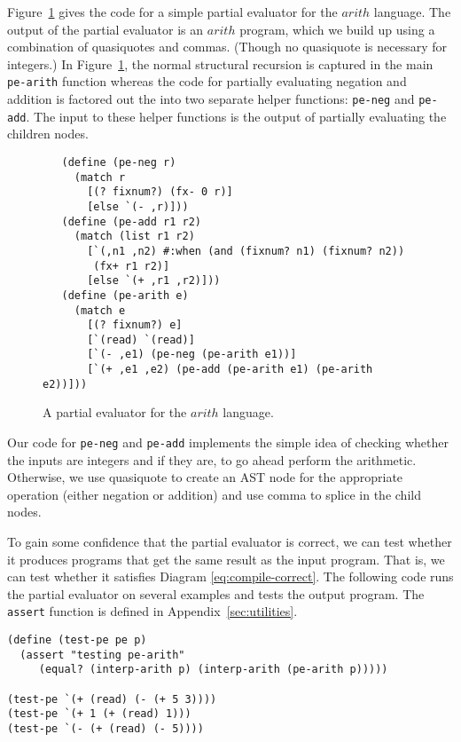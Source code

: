 \documentclass[12pt]{book}
\newcommand{\itm}[1]{\ensuremath{\mathit{#1}}}
\begin{document}
Figure~\ref{fig:pe-arith} gives the code for a simple partial
evaluator for the $\itm{arith}$ language. The output of the partial
evaluator is an $\itm{arith}$ program, which we build up using a
combination of quasiquotes and commas. (Though no quasiquote is
necessary for integers.) In Figure~\ref{fig:pe-arith}, the normal
structural recursion is captured in the main \texttt{pe-arith}
function whereas the code for partially evaluating negation and
addition is factored out the into two separate helper functions:
\texttt{pe-neg} and \texttt{pe-add}. The input to these helper
functions is the output of partially evaluating the children nodes.

\begin{figure}[tbp]
\begin{lstlisting}
   (define (pe-neg r)
     (match r
       [(? fixnum?) (fx- 0 r)]
       [else `(- ,r)]))
   (define (pe-add r1 r2)
     (match (list r1 r2)
       [`(,n1 ,n2) #:when (and (fixnum? n1) (fixnum? n2))
        (fx+ r1 r2)]
       [else `(+ ,r1 ,r2)]))
   (define (pe-arith e)
     (match e
       [(? fixnum?) e]
       [`(read) `(read)]
       [`(- ,e1) (pe-neg (pe-arith e1))]
       [`(+ ,e1 ,e2) (pe-add (pe-arith e1) (pe-arith e2))]))   
\end{lstlisting}
\caption{A partial evaluator for the $\itm{arith}$ language.}
\label{fig:pe-arith}
\end{figure}

Our code for \texttt{pe-neg} and \texttt{pe-add} implements the simple
idea of checking whether the inputs are integers and if they are, to
go ahead perform the arithmetic.  Otherwise, we use quasiquote to
create an AST node for the appropriate operation (either negation or
addition) and use comma to splice in the child nodes.

To gain some confidence that the partial evaluator is correct, we can
test whether it produces programs that get the same result as the
input program. That is, we can test whether it satisfies Diagram
\eqref{eq:compile-correct}. The following code runs the partial
evaluator on several examples and tests the output program.  The
\texttt{assert} function is defined in Appendix~\ref{sec:utilities}.
\begin{lstlisting}
(define (test-pe pe p)
  (assert "testing pe-arith"
     (equal? (interp-arith p) (interp-arith (pe-arith p)))))

(test-pe `(+ (read) (- (+ 5 3))))
(test-pe `(+ 1 (+ (read) 1)))
(test-pe `(- (+ (read) (- 5))))
\end{lstlisting}
\end{document}
